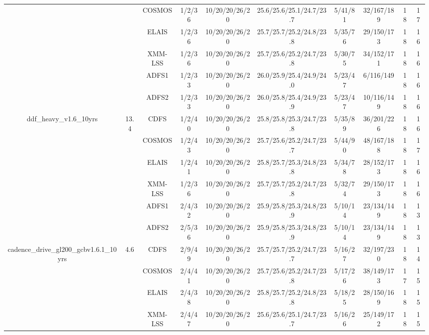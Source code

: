 \begin{center}
\begin{sidewaystable}[htbp]
{\begin{tabular}{c|c|c|c|c|c|c|c|c|c}
& & COSMOS & 1/2/36 & 10/20/20/26/20 & 25.6/25.6/25.1/24.7/23.7 & 5/41/81 & 32/167/189 & 18 & 17 \\ 
& & ELAIS & 1/2/36 & 10/20/20/26/20 & 25.7/25.7/25.2/24.8/23.8 & 5/35/76 & 29/150/173 & 18 & 16 \\ 
& & XMM-LSS & 1/2/36 & 10/20/20/26/20 & 25.7/25.6/25.2/24.7/23.8 & 5/30/75 & 34/152/171 & 18 & 16 \\ 
\hline 
& & ADFS1 & 1/2/33 & 10/20/20/26/20 & 26.0/25.9/25.4/24.9/24.0 & 5/23/47 & 6/116/149 & 18 & 16 \\ 
& & ADFS2 & 1/2/33 & 10/20/20/26/20 & 26.0/25.8/25.4/24.9/23.9 & 5/23/47 & 10/116/149 & 18 & 16 \\ 
ddf\_heavy\_v1.6\_10yrs& 13.4& CDFS & 1/2/40 & 10/20/20/26/20 & 25.8/25.8/25.3/24.7/23.8 & 5/35/89 & 36/201/226 & 18 & 16 \\ 
& & COSMOS & 1/2/43 & 10/20/20/26/20 & 25.7/25.6/25.2/24.7/23.7 & 5/44/90 & 48/167/188 & 18 & 17 \\ 
& & ELAIS & 1/2/41 & 10/20/20/26/20 & 25.8/25.7/25.3/24.8/23.8 & 5/34/78 & 28/152/173 & 18 & 16 \\ 
& & XMM-LSS & 1/2/36 & 10/20/20/26/20 & 25.7/25.7/25.2/24.7/23.8 & 5/32/74 & 29/150/173 & 18 & 16 \\ 
\hline 
& & ADFS1 & 2/4/32 & 10/20/20/26/20 & 25.9/25.8/25.3/24.8/23.9 & 5/10/14 & 23/134/149 & 18 & 13 \\ 
& & ADFS2 & 2/5/36 & 10/20/20/26/20 & 25.9/25.8/25.3/24.8/23.9 & 5/10/14 & 23/134/149 & 18 & 13 \\ 
cadence\_drive\_gl200\_gcbv1.6.1\_10yrs& 4.6& CDFS & 2/9/49 & 10/20/20/26/20 & 25.7/25.7/25.2/24.7/23.7 & 5/16/27 & 32/197/230 & 18 & 14 \\ 
& & COSMOS & 2/4/41 & 10/20/20/26/20 & 25.7/25.6/25.2/24.7/23.8 & 5/17/26 & 38/149/173 & 17 & 15 \\ 
& & ELAIS & 2/4/38 & 10/20/20/26/20 & 25.8/25.7/25.2/24.8/23.8 & 5/18/25 & 28/150/169 & 18 & 15 \\ 
& & XMM-LSS & 2/4/47 & 10/20/20/26/20 & 25.6/25.6/25.1/24.7/23.7 & 5/16/26 & 25/149/172 & 18 & 15 \\ 
\end{tabular}} 
\end{sidewaystable} 
\end{center}
